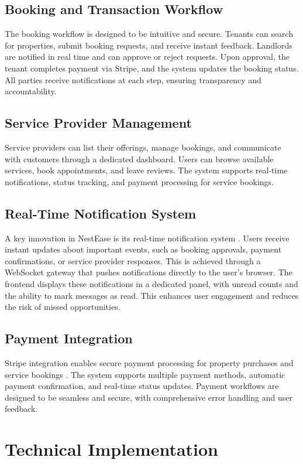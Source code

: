 \documentclass[conference]{IEEEtran}
\begin{document}
\subsection{Booking and Transaction Workflow}
The booking workflow is designed to be intuitive and secure. Tenants can search for properties, submit booking requests, and receive instant feedback. Landlords are notified in real time and can approve or reject requests. Upon approval, the tenant completes payment via Stripe, and the system updates the booking status. All parties receive notifications at each step, ensuring transparency and accountability.

\subsection{Service Provider Management}
Service providers can list their offerings, manage bookings, and communicate with customers through a dedicated dashboard. Users can browse available services, book appointments, and leave reviews. The system supports real-time notifications, status tracking, and payment processing for service bookings.

\subsection{Real-Time Notification System}
A key innovation in NestEase is its real-time notification system \cite{websocket_architecture}. Users receive instant updates about important events, such as booking approvals, payment confirmations, or service provider responses. This is achieved through a WebSocket gateway that pushes notifications directly to the user's browser. The frontend displays these notifications in a dedicated panel, with unread counts and the ability to mark messages as read. This enhances user engagement and reduces the risk of missed opportunities.

\subsection{Payment Integration}
Stripe integration enables secure payment processing for property purchases and service bookings \cite{payment_security}. The system supports multiple payment methods, automatic payment confirmation, and real-time status updates. Payment workflows are designed to be seamless and secure, with comprehensive error handling and user feedback.

\section{Technical Implementation}
\end{document}
